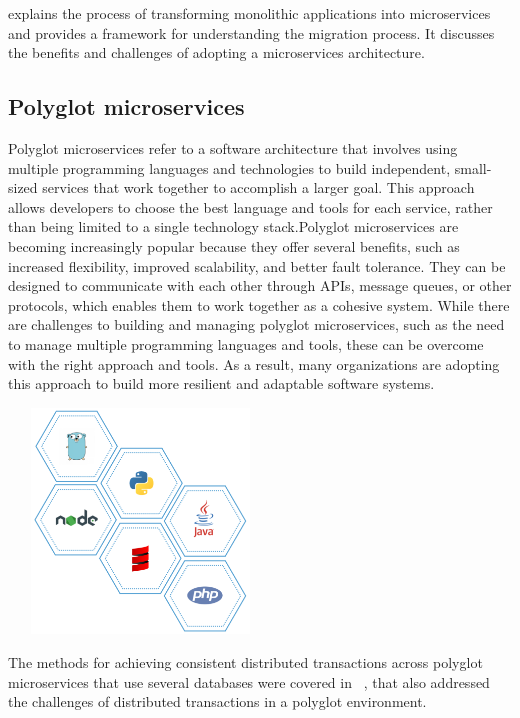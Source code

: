\cite{escobar2016towards}explains the process of transforming monolithic applications into microservices and provides a framework for understanding the migration process. It discusses the benefits and challenges of adopting a microservices architecture.

\subsection{ Polyglot microservices}
Polyglot microservices refer to a software architecture that involves using multiple programming languages and technologies to build independent, small-sized services that work together to accomplish a larger goal. This approach allows developers to choose the best language and tools for each service, rather than being limited to a single technology stack.Polyglot microservices are becoming increasingly popular because they offer several benefits, such as increased flexibility, improved scalability, and better fault tolerance. They can be designed to communicate with each other through APIs, message queues, or other protocols, which enables them to work together as a cohesive system.
While there are challenges to building and managing polyglot microservices, such as the need to manage multiple programming languages and tools, these can be overcome with the right approach and tools. As a result, many organizations are adopting this approach to build more resilient and adaptable software systems.

\includegraphics[width=7cm, height=6cm]{polyglot_microservices}

The methods for achieving consistent distributed transactions across polyglot microservices that use several databases were covered in  ~\cite{zhang2019grit}, that also addressed the challenges of distributed transactions in a polyglot environment.

